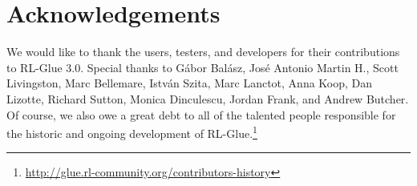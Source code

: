 \documentclass[twoside,11pt]{article}
\begin{document}
\vspace{-0.2cm}
\section{Acknowledgements}
\vspace{-0.2cm}
We would like to thank the users, testers, and developers for their contributions to RL-Glue 3.0. Special thanks to 
G\'{a}bor Bal\'{a}sz,  %
Jos\'{e} Antonio Martin H.,  %
Scott Livingston, %
Marc Bellemare, 
Istv\'{a}n Szita,  %
Marc Lanctot, 
Anna Koop, 
Dan Lizotte,
Richard Sutton,
Monica Dinculescu,
Jordan Frank, and
Andrew Butcher.  Of course, we also owe a great debt to all of the talented people responsible for the historic and ongoing development of RL-Glue.\footnote{\url{http://glue.rl-community.org/contributors-history}}

%
%




\setlength{\bibsep}{6pt}

\end{document}
